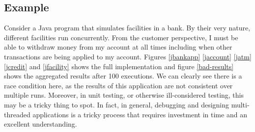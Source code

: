 \documentclass[10pt,a4paper]{article}
\begin{document}
\subsection{Example}
Consider a Java program that simulates facilities in a bank. By their very nature, different facilities run concurrently. From the customer perspective, I must be able to withdraw money from my account at all times including when other transactions are being applied to my account. Figures  \ref{jbankapp} \ref{jaccount} \ref{jatm} \ref{jcredit} and \ref{jfacility} shows the full implementation and figure \ref{bad-results} shows the aggregated results after 100 executions.  We can clearly see there is a race condition here, as the results of this application are not consistent over multiple runs. Moreover, in unit testing, or otherwise ill-considered testing, this may be a tricky thing to spot. In fact, in general, debugging and designing multi-threaded applications is a tricky process that requires investment in time and an excellent understanding. 
\newline\newline
\end{document}

